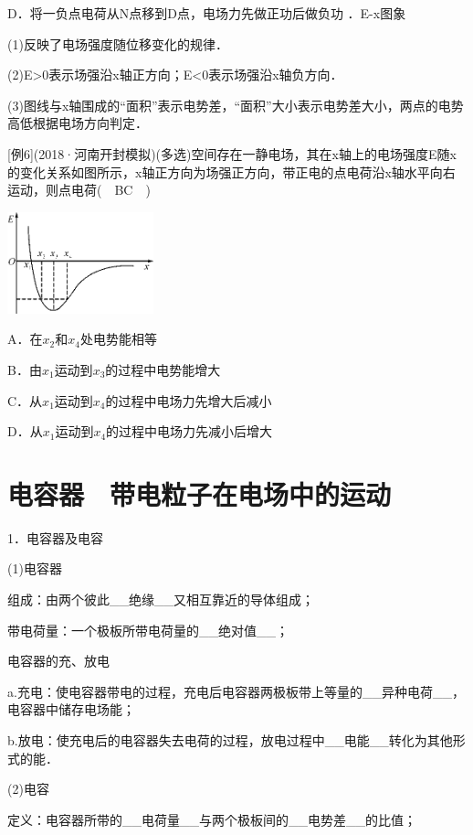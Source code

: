 D．将一负点电荷从N点移到D点，电场力先做正功后做负功
．E-x图象

(1)反映了电场强度随位移变化的规律．

(2)E\textgreater0表示场强沿x轴正方向；E\textless0表示场强沿x轴负方向．

(3)图线与x轴围成的``面积''表示电势差，``面积''大小表示电势差大小，两点的电势高低根据电场方向判定．

{[}例6{]}(2018·河南开封模拟)(多选)空间存在一静电场，其在x轴上的电场强度E随x的变化关系如图所示，x轴正方向为场强正方向，带正电的点电荷沿x轴水平向右运动，则点电荷(　BC　)

\begin{center}\includegraphics[width=1.66667in,height=1.15625in]{media/image286.png}\end{center}

A．在$x_2$和$x_4$处电势能相等

B．由$x_1$运动到$x_3$的过程中电势能增大

C．从$x_1$运动到$x_4$的过程中电场力先增大后减小

D．从$x_1$运动到$x_4$的过程中电场力先减小后增大

\newpage
\section{电容器　带电粒子在电场中的运动}





1．电容器及电容

(1)电容器

组成：由两个彼此\_\_绝缘\_\_又相互靠近的导体组成；

带电荷量：一个极板所带电荷量的\_\_绝对值\_\_；

电容器的充、放电

a.充电：使电容器带电的过程，充电后电容器两极板带上等量的\_\_异种电荷\_\_，电容器中储存电场能；

b.放电：使充电后的电容器失去电荷的过程，放电过程中\_\_电能\_\_转化为其他形式的能．

(2)电容

定义：电容器所带的\_\_电荷量\_\_与两个极板间的\_\_电势差\_\_的比值；

